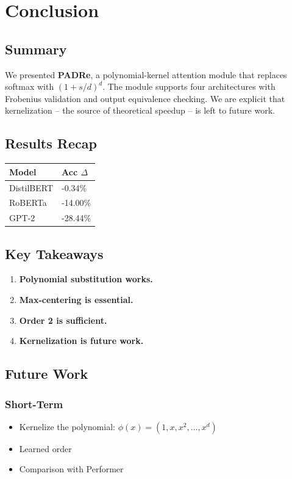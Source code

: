 \section{Conclusion}

\subsection{Summary}

We presented \textbf{PADRe}, a polynomial-kernel attention module that replaces 
softmax with $(1 + s/d)^d$. The module supports four architectures with 
Frobenius validation and output equivalence checking. We are explicit that 
kernelization -- the source of theoretical speedup -- is left to future work.

\subsection{Results Recap}

\begin{table}[H]
\centering
\small
\begin{tabular}{ll}
\toprule
\textbf{Model} & \textbf{Acc $\Delta$} \\
\midrule
DistilBERT & -0.34\% \\
RoBERTa & -14.00\% \\
GPT-2 & -28.44\% \\
\bottomrule
\end{tabular}
\end{table}

\subsection{Key Takeaways}

\begin{enumerate}
\item \textbf{Polynomial substitution works.}
\item \textbf{Max-centering is essential.}
\item \textbf{Order 2 is sufficient.}
\item \textbf{Kernelization is future work.}

\end{enumerate}
\subsection{Future Work}

\subsubsection{Short-Term}
\begin{itemize}
\item Kernelize the polynomial: $\phi(x) = (1, x, x^2, \ldots, x^d)$
\item Learned order
\item Comparison with Performer

\end{itemize}
